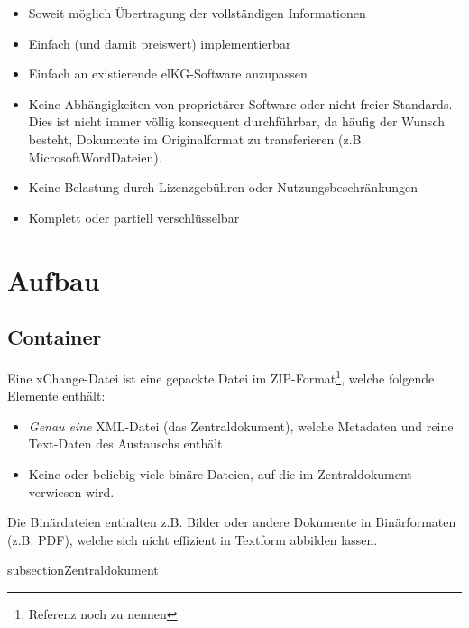 \documentclass[a4paper]{scrartcl}
\begin{document}
\begin{itemize}
  \item Soweit möglich Übertragung der vollständigen Informationen
  \item Einfach (und damit preiswert) implementierbar
  \item Einfach an existierende elKG-Software anzupassen
  \item Keine Abhängigkeiten von proprietärer Software oder nicht-freier Standards. Dies ist nicht immer völlig konsequent durchführbar, da häufig der Wunsch besteht, Dokumente im Originalformat zu transferieren (z.B. Microsoft\texttrademark Word\texttrademark Dateien).
  \item Keine Belastung durch Lizenzgebühren oder Nutzungsbeschränkungen
  \item Komplett oder partiell verschlüsselbar
\end{itemize}

\section{Aufbau}
\subsection{Container}
Eine xChange-Datei ist eine gepackte Datei im ZIP-Format\footnote{Referenz noch zu nennen}, welche folgende Elemente enthält:
\begin{itemize}
\item \textit{Genau eine} XML-Datei (das Zentraldokument), welche Metadaten und reine Text-Daten des Austauschs enthält
\item Keine oder beliebig viele binäre Dateien, auf die im Zentraldokument verwiesen wird.
\end{itemize}
Die Binärdateien enthalten z.B. Bilder oder andere Dokumente in Binärformaten (z.B. PDF), welche sich nicht effizient in Textform abbilden lassen.

subsection{Zentraldokument}
\end{document}
